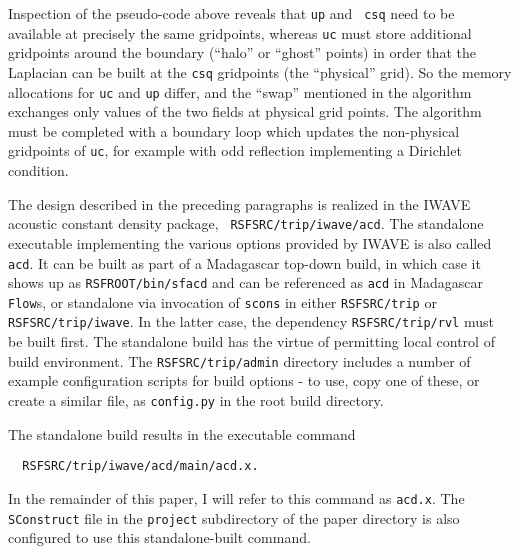 Inspection of the pseudo-code above reveals that {\tt up} and {\tt
  csq} need to be available at precisely the same gridpoints, whereas
{\tt uc} must store additional gridpoints around the boundary
(``halo'' or ``ghost'' points) in order that the Laplacian can be
built at the {\tt csq} gridpoints (the ``physical'' grid). So the
memory allocations for {\tt uc} and {\tt up} differ, and the ``swap''
mentioned in the algorithm exchanges only values of the two fields at
physical grid points. The algorithm must be completed with a boundary
loop which updates the non-physical gridpoints of {\tt uc}, for
example with odd reflection implementing a Dirichlet condition.

The design described in the preceding paragraphs is realized in the
IWAVE acoustic constant density package, {\tt
  RSFSRC/trip/iwave/acd}. The standalone executable implementing the
various options provided by IWAVE is also called {\tt acd}. It can be
built as part of a Madagascar top-down build, in which case it shows
up as {\tt RSFROOT/bin/sfacd} and can be referenced as {\tt acd} in
Madagascar {\tt Flow}s, or standalone via invocation of {\tt scons} in
either {\tt RSFSRC/trip} or {\tt RSFSRC/trip/iwave}. In the latter
case, the dependency {\tt RSFSRC/trip/rvl} must be built first. The
standalone build has the virtue of permitting local control of build
environment. The {\tt RSFSRC/trip/admin} directory includes a number
of example configuration scripts for build options - to use, copy one
of these, or create a similar file, as
{\tt config.py} in the root build directory.

The standalone build results in the executable command 
\begin{verbatim}
  RSFSRC/trip/iwave/acd/main/acd.x. 
\end{verbatim}
In the remainder of this paper, I
will refer to this command as {\tt acd.x}. The {\tt SConstruct} file
in the {\tt project} subdirectory of the paper directory is also
configured to use this standalone-built command.

